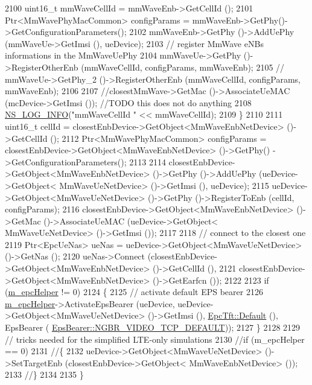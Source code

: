 \begin{DoxyCode}
2100                 uint16\_t mmWaveCellId = mmWaveEnb->GetCellId ();
2101                 Ptr<MmWavePhyMacCommon> configParams = mmWaveEnb->GetPhy()->GetConfigurationParameters();
2102                 mmWaveEnb->GetPhy ()->AddUePhy (mmWaveUe->GetImsi (), ueDevice);
2103                 \textcolor{comment}{// register MmWave eNBs informations in the MmWaveUePhy}
2104                 mmWaveUe->GetPhy ()->RegisterOtherEnb (mmWaveCellId, configParams, mmWaveEnb);
2105         \textcolor{comment}{//      mmWaveUe->GetPhy\_2 ()->RegisterOtherEnb (mmWaveCellId, configParams, mmWaveEnb);}
2106 
2107                 \textcolor{comment}{//closestMmWave->GetMac ()->AssociateUeMAC (mcDevice->GetImsi ()); //TODO this does not do
       anything}
2108                 \hyperlink{group__logging_gafbd73ee2cf9f26b319f49086d8e860fb}{NS\_LOG\_INFO}(\textcolor{stringliteral}{"mmWaveCellId "} << mmWaveCellId);
2109         \}
2110         
2111         uint16\_t cellId = closestEnbDevice->GetObject<MmWaveEnbNetDevice> ()->GetCellId ();
2112         Ptr<MmWavePhyMacCommon> configParams = closestEnbDevice->GetObject<MmWaveEnbNetDevice> ()->GetPhy()
      ->GetConfigurationParameters();
2113 
2114         closestEnbDevice->GetObject<MmWaveEnbNetDevice> ()->GetPhy ()->AddUePhy (ueDevice->GetObject<
      MmWaveUeNetDevice> ()->GetImsi (), ueDevice);
2115         ueDevice->GetObject<MmWaveUeNetDevice> ()->GetPhy ()->RegisterToEnb (cellId, configParams);
2116         closestEnbDevice->GetObject<MmWaveEnbNetDevice> ()->GetMac ()->AssociateUeMAC (ueDevice->GetObject<
      MmWaveUeNetDevice> ()->GetImsi ());
2117 
2118         \textcolor{comment}{// connect to the closest one}
2119         Ptr<EpcUeNas> ueNas = ueDevice->GetObject<MmWaveUeNetDevice> ()->GetNas ();
2120         ueNas->Connect (closestEnbDevice->GetObject<MmWaveEnbNetDevice> ()->GetCellId (),
2121                                         closestEnbDevice->GetObject<MmWaveEnbNetDevice> ()->GetEarfcn ());
2122 
2123         \textcolor{keywordflow}{if} (\hyperlink{classns3_1_1MmWaveHelper_a03b33f9a2480a4cdd8ffe697ccc08e9e}{m\_epcHelper} != 0)
2124         \{
2125                 \textcolor{comment}{// activate default EPS bearer}
2126                 \hyperlink{classns3_1_1MmWaveHelper_a03b33f9a2480a4cdd8ffe697ccc08e9e}{m\_epcHelper}->ActivateEpsBearer (ueDevice, ueDevice->GetObject<MmWaveUeNetDevice>
       ()->GetImsi (), \hyperlink{classns3_1_1EpcTft_a48c099da249ba99152c2e597c864e155}{EpcTft::Default} (), EpsBearer (
      \hyperlink{structns3_1_1EpsBearer_aecf0c67109c5eb4ec0b07226fff5885ea0e7232f1a6148d754be3a3d9e425d452}{EpsBearer::NGBR\_VIDEO\_TCP\_DEFAULT}));
2127         \}
2128 
2129         \textcolor{comment}{// tricks needed for the simplified LTE-only simulations}
2130         \textcolor{comment}{//if (m\_epcHelper == 0)}
2131         \textcolor{comment}{//\{}
2132         ueDevice->GetObject<MmWaveUeNetDevice> ()->SetTargetEnb (closestEnbDevice->GetObject<
      MmWaveEnbNetDevice> ());
2133         \textcolor{comment}{//\}}
2134 
2135 \}
\end{DoxyCode}



